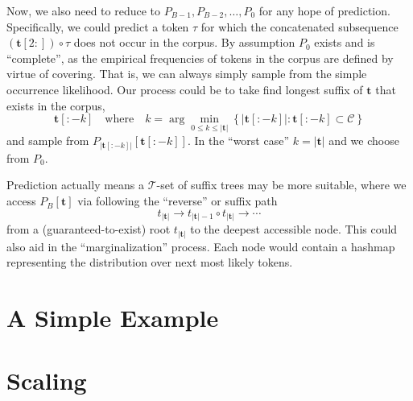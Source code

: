 \documentclass[11pt, oneside]{amsart}   	%
\begin{document}
Now, we also need to reduce to $P_{B-1}, P_{B-2}, \dotsc, P_0$ for any hope of prediction. Specifically, we could predict a token $\tau$ for which the concatenated subsequence $(\mathbf{t}[2:]) \circ \tau$ does not occur in the corpus. By assumption $P_0$ exists and is ``complete'', as the empirical frequencies of tokens in the corpus are defined by virtue of covering. That is, we can always simply sample from the simple occurrence likelihood. Our process could be to take find longest suffix of $\mathbf{t}$ that exists in the corpus, 
\begin{equation*}
	\mathbf{t}[:-k] 
	\quad\text{where}\quad 
	k = \arg \min_{0 \leq k \leq |\mathbf{t}|} \left\{ |\mathbf{t}[:-k] | : \mathbf{t}[:-k] \subset \mathcal{C} \right\}
\end{equation*}
and sample from $P_{|\mathbf{t}[:-k]|}[\mathbf{t}[:-k]]$. In the ``worst case'' $k = |\mathbf{t}|$ and we choose from $P_0$. 

Prediction actually means a $\mathcal{T}$-set of suffix trees may be more suitable, where we access $P_B[\mathbf{t}]$ via following the ``reverse'' or suffix path 
\begin{equation*}
	t_{|\mathbf{t}|} \rightarrow t_{|\mathbf{t}|-1} \circ t_{|\mathbf{t}|} \rightarrow \dotsb
\end{equation*}
from a (guaranteed-to-exist) root $t_{|\mathbf{t}|}$ to the deepest accessible node. This could also aid in the ``marginalization'' process. Each node would contain  a hashmap representing the distribution over next most likely tokens. 

\section{A Simple Example}


\section{Scaling}
\end{document}
